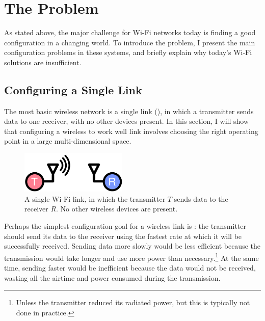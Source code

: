 \section{The Problem}
\label{sec:intro_problem}
As stated above, the major challenge for Wi-Fi networks today is finding a good configuration in a changing world. To introduce the problem, I present the main configuration problems in these systems, and briefly explain why today's Wi-Fi solutions are insufficient.

\subsection{Configuring a Single Link}
\label{sec:intro_single_link_problems}
The most basic wireless network is a single link (), in which a transmitter sends data to one receiver, with no other devices present. In this section, I will show that configuring a wireless to work well link involves choosing the right operating point in a large multi-dimensional space. 

\begin{figure}[tp]
	\centering
	\includegraphics[width=2in]{figures/single_link_circle}
	\caption[A single Wi-Fi link]{\label{fig:wifi_link}A single Wi-Fi link, in which the transmitter $T$ sends data to the receiver $R$. No other wireless devices are present.}
\end{figure}

Perhaps the simplest configuration goal for a wireless link is : the transmitter should send its data to the receiver using the fastest rate at which it will be successfully received. Sending data more slowly would be less efficient because the transmission would take longer and use more power than necessary.\footnote{Unless the transmitter reduced its radiated power, but this is typically not done in practice.} At the same time, sending faster would be inefficient because the data would not be received, wasting all the airtime and power consumed during the transmission.

